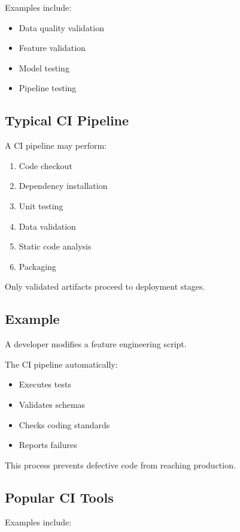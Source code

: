 Examples include:

\begin{itemize}
    \item Data quality validation
    \item Feature validation
    \item Model testing
    \item Pipeline testing
\end{itemize}

\subsection{Typical CI Pipeline}

A CI pipeline may perform:

\begin{enumerate}
    \item Code checkout
    \item Dependency installation
    \item Unit testing
    \item Data validation
    \item Static code analysis
    \item Packaging
\end{enumerate}

Only validated artifacts proceed to deployment stages.

\subsection{Example}

A developer modifies a feature engineering script.

The CI pipeline automatically:

\begin{itemize}
    \item Executes tests
    \item Validates schemas
    \item Checks coding standards
    \item Reports failures
\end{itemize}

This process prevents defective code from reaching production.

\subsection{Popular CI Tools}

Examples include:

